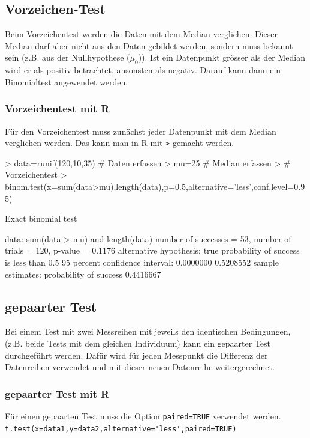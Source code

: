 \subsection{Vorzeichen-Test}
Beim Vorzeichentest werden die Daten mit dem Median verglichen. Dieser Median 
darf aber nicht aus den Daten gebildet werden, sondern muss bekannt sein 
(z.B. aus der Nullhypothese ($\mu_0$)). Ist ein Datenpunkt grösser als der 
Median wird er als positiv betrachtet, ansonsten als negativ. Darauf kann dann 
ein Binomialtest angewendet werden. 
\subsubsection{Vorzeichentest mit R}
Für den Vorzeichentest muss zunächst jeder Datenpunkt mit dem Median verglichen 
werden. Das kann man in R mit \verb!>! gemacht werden. \\
\begin{Schunk}
\begin{Sinput}
> data=runif(120,10,35)               # Daten erfassen
> mu=25                               # Median erfassen
> # Vorzeichentest
> binom.test(x=sum(data>mu),length(data),p=0.5,alternative='less',conf.level=0.95)
\end{Sinput}
\begin{Soutput}
	Exact binomial test

data:  sum(data > mu) and length(data)
number of successes = 53, number of trials = 120, p-value = 0.1176
alternative hypothesis: true probability of success is less than 0.5
95 percent confidence interval:
 0.0000000 0.5208552
sample estimates:
probability of success 
             0.4416667 
\end{Soutput}
\end{Schunk}

\subsection{gepaarter Test}
Bei einem Test mit zwei Messreihen mit jeweils den identischen Bedingungen, 
(z.B. beide Tests mit dem gleichen Individuum) kann ein gepaarter Test 
durchgeführt werden. Dafür wird für jeden Messpunkt die Differenz der 
Datenreihen verwendet und mit dieser neuen Datenreihe weitergerechnet. 

\subsubsection{gepaarter Test mit R}
Für einen gepaarten Test muss die Option \verb!paired=TRUE! verwendet werden. \\
\verb!t.test(x=data1,y=data2,alternative='less',paired=TRUE)!

